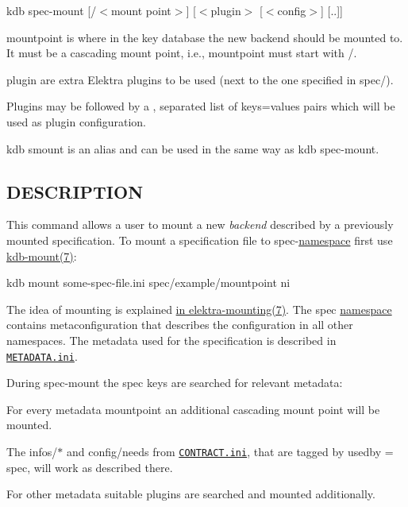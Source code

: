 {\ttfamily kdb spec-\/mount \mbox{[}/$<$mount point$>$\mbox{]} \mbox{[}$<$plugin$>$ \mbox{[}$<$config$>$\mbox{]} \mbox{[}..\mbox{]}\mbox{]}}


\begin{DoxyItemize}
\item {\ttfamily mountpoint} is where in the key database the new backend should be mounted to. It must be a cascading mount point, i.\+e., {\ttfamily mountpoint} must start with {\ttfamily /}.
\item {\ttfamily plugin} are extra Elektra plugins to be used (next to the one specified in {\ttfamily spec/}).
\item Plugins may be followed by a {\ttfamily ,} separated list of {\ttfamily keys=values} pairs which will be used as plugin configuration.
\end{DoxyItemize}

{\ttfamily kdb smount} is an alias and can be used in the same way as {\ttfamily kdb spec-\/mount}.

\subsection*{D\+E\+S\+C\+R\+I\+P\+T\+I\+ON}

This command allows a user to mount a new {\itshape backend} described by a previously mounted specification. To mount a specification file to {\ttfamily spec}-\/\hyperlink{md_doc_help_elektra-namespaces_doc_help_elektra-namespaces_md}{namespace} first use \hyperlink{md_doc_help_kdb-mount_doc_help_kdb-mount_md}{kdb-\/mount(7)}\+: \begin{DoxyVerb}    kdb mount some-spec-file.ini spec/example/mountpoint ni
\end{DoxyVerb}


The idea of mounting is explained \hyperlink{md_doc_help_elektra-mounting_doc_help_elektra-mounting_md}{in elektra-\/mounting(7)}. The {\ttfamily spec} \hyperlink{md_doc_help_elektra-namespaces_doc_help_elektra-namespaces_md}{namespace} contains metaconfiguration that describes the configuration in all other namespaces. The metadata used for the specification is described in \href{/home/markus/Projekte/Elektra/current/doc/METADATA.ini}{\tt M\+E\+T\+A\+D\+A\+T\+A.\+ini}.

During {\ttfamily spec-\/mount} the {\ttfamily spec} keys are searched for relevant metadata\+:


\begin{DoxyItemize}
\item For every metadata {\ttfamily mountpoint} an additional cascading mount point will be mounted.
\item The {\ttfamily infos/$\ast$} and {\ttfamily config/needs} from \href{/home/markus/Projekte/Elektra/current/doc/CONTRACT.ini}{\tt C\+O\+N\+T\+R\+A\+C\+T.\+ini}, that are tagged by {\ttfamily usedby = spec}, will work as described there.
\item For other metadata suitable plugins are searched and mounted additionally.
\end{DoxyItemize}

